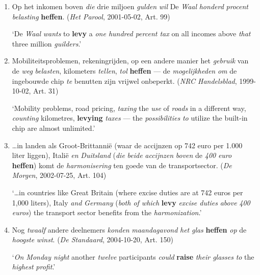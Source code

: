 \documentclass[
]{book}
\begin{document}
\begin{enumerate}
\def\labelenumi{(\arabic{enumi})}
\setcounter{enumi}{14}
\item
  Op het inkomen boven \emph{die} drie miljoen \emph{gulden} \emph{wil} De \emph{Waal} \emph{honderd} \emph{procent} \emph{belasting} \textbf{heffen}. (\emph{Het Parool}, 2001-05-02, Art. 99)

  `De \emph{Waal} \emph{wants} to \textbf{levy} a \emph{one hundred percent tax} on all incomes above \emph{that} three million \emph{guilders}.'
\item
  Mobiliteitsproblemen, rekeningrijden, op een andere manier het \emph{gebruik} van de \emph{weg} \emph{belasten}, kilometers \emph{tellen}, \emph{tol} \textbf{heffen} --- de \emph{mogelijkheden} \emph{om} de ingebouwde chip \emph{te} benutten zijn vrijwel onbeperkt. (\emph{NRC Handelsblad}, 1999-10-02, Art. 31)

  `Mobility problems, road pricing, \emph{taxing} the \emph{use} of \emph{roads} in a different way, \emph{counting} kilometres, \textbf{levying} \emph{taxes} --- the \emph{possibilities} \emph{to} utilize the built-in chip are almost unlimited.'
\item
  \ldots in landen als Groot-Brittannië (waar de accijnzen op 742 euro per 1.000 liter liggen), Italië \emph{en} \emph{Duitsland} (\emph{die} \emph{beide} \emph{accijnzen} \emph{boven} de \emph{400} \emph{euro} \textbf{heffen}) komt de \emph{harmonisering} ten goede van de transportsector. (\emph{De Morgen}, 2002-07-25, Art. 104)

  `\ldots in countries like Great Britain (where excise duties are at 742 euros per 1,000 liters), Italy \emph{and} \emph{Germany} (\emph{both of which} \textbf{levy} \emph{excise duties} \emph{above} \emph{400} \emph{euros}) the transport sector benefits from the \emph{harmonization}.'
\item
  Nog \emph{twaalf} andere deelnemers \emph{konden} \emph{maandagavond} \emph{het} \emph{glas} \textbf{heffen} \emph{op} de \emph{hoogste} \emph{winst}. (\emph{De Standaard}, 2004-10-20, Art. 150)

  `\emph{On Monday night} another \emph{twelve} participants \emph{could} \textbf{raise} \emph{their glasses} \emph{to} the \emph{highest} \emph{profit}.'
\end{enumerate}
\end{document}
